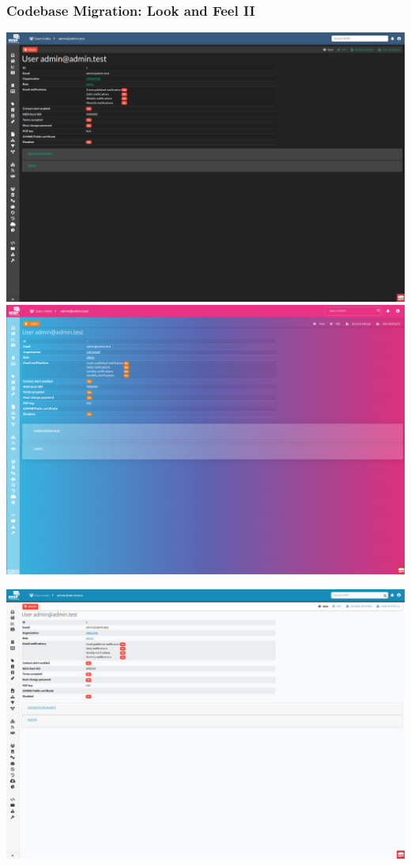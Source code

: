 \begin{frame}
    \frametitle{Codebase Migration: Look and Feel II}
    \begin{minipage}{0.5\textwidth}
        \includegraphics[width=0.9\linewidth]{pictures/theme1.png}
        \vspace{1em}
        \includegraphics[width=0.9\linewidth]{pictures/theme2.png}
    \end{minipage}%
    \begin{minipage}{0.5\textwidth}
        \includegraphics[width=0.9\linewidth]{pictures/theme3.png}

\end{minipage}
\end{frame}
